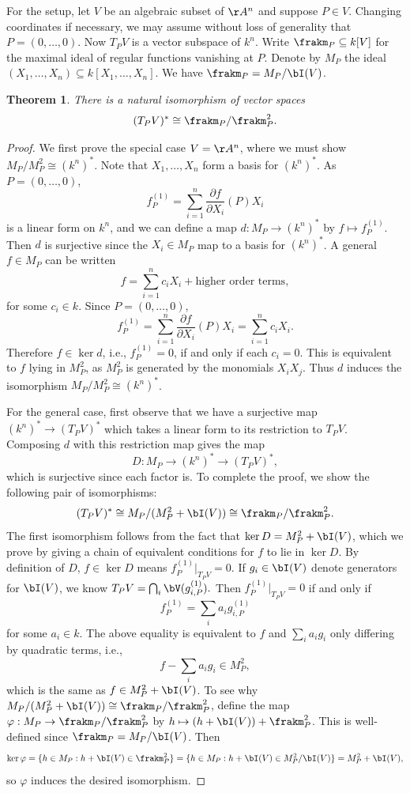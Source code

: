 \documentclass[12pt]{amsart}
\theoremstyle{plain}
\newtheorem{theorem}{Theorem}%
\begin{document}
For the setup, let $V$ be an algebraic subset of $\AA^n$ and suppose $P \in V$.
Changing coordinates if necessary, we may assume without loss of generality that $P=(0, \ldots, 0)$.
Now $T_PV$ is a vector subspace of $k^n$.
Write $\frakm_P\subseteq k[V]$ for the maximal ideal of regular functions vanishing at $P$.
Denote by $M_P$ the ideal $(X_1, \ldots, X_n) \subseteq k[X_1,\ldots, X_n]$.
We have $\frakm_P=M_P/\bI(V)$.

\begin{theorem}
There is a natural isomorphism of vector spaces
$$(T_PV)^* \cong \frakm_P/\frakm_P^2.$$
\end{theorem}
\begin{proof}
We first prove the special case $V=\AA^n$, where we must show $M_P/M_P^2\cong(k^n)^*$.
Note that $X_1, \ldots, X_n$ form a basis for $(k^n)^*$.
As $P=(0, \ldots, 0)$,
$$f_P^{(1)}=\sum_{i=1}^n \frac{\partial f}{\partial X_i}(P) X_i$$
is a linear form on $k^n$, and we can define a map $d : M_P\to(k^n)^*$ by $f \mapsto f_P^{(1)}$.
Then $d$ is surjective since the $X_i \in M_P$ map to a basis for $(k^n)^*$.
A general $f \in M_P$ can be written
$$f=\sum_{i=1}^n c_i X_i + \text{higher order terms},$$
for some $c_i \in k$.
Since $P=(0,\ldots,0)$,
$$f_P^{(1)}=\sum_{i=1}^n\frac{\partial f}{\partial X_i}(P) X_i = \sum_{i=1}^n c_i X_i.$$
Therefore $f \in \ker d$, i.e., $f_P^{(1)} = 0$, if and only if each $c_i=0$.
This is equivalent to $f$ lying in $M_P^2$, as $M_P^2$ is generated by the monomials $X_i X_j$.
Thus $d$ induces the isomorphism $M_P/M_P^2 \cong (k^n)^*$.

For the general case, first observe that we have a surjective map $(k^n)^* \to (T_PV)^*$ which takes a linear form to its restriction to $T_PV$.
Composing $d$ with this restriction map gives the map
$$D:M_P \to (k^n)^* \to (T_PV)^*,$$
which is surjective since each factor is.
To complete the proof, we show the following pair of isomorphisms:
$$(T_PV)^* \cong M_P/(M_P^2+\bI(V)) \cong \frakm_P/\frakm_P^2.$$
The first isomorphism follows from the fact that $\ker D = M_P^2+\bI(V)$, which we prove by giving a chain of equivalent conditions for $f$ to lie in $\ker D$.
By definition of $D$, $f \in \ker D$ means $f_P^{(1)} \big|_{T_PV} = 0$.
If $g_i \in \bI(V)$ denote generators for $\bI(V)$, we know $T_PV = \bigcap_i \bV(g_{i,P}^{(1)}).$
Then $f_P^{(1)} \big|_{T_PV}=0$ if and only if 
$$f_P^{(1)} = \sum_i a_i g_{i,P}^{(1)}$$
for some $a_i \in k$.
The above equality is equivalent to $f$ and $\sum_i a_i g_i$ only differing by quadratic terms, i.e., 
$$f - \sum_i a_i g_i \in M_P^2,$$
which is the same as $f \in M_P^2 + \bI(V)$.
To see why $M_P/(M_P^2+\bI(V)) \cong \frakm_P/\frakm_P^2$, define the map $\varphi : M_P \to \frakm_P/\frakm_P^2$ by $h \mapsto (h+\bI(V)) + \frakm_P^2$.
This is well-defined since $\frakm_P=M_P/\bI(V)$.
Then
$$\ker \varphi = \{h \in M_P : h + \bI(V) \in \frakm_P^2\}=\{h \in M_P:h+\bI(V)\in M_P^2/\bI(V)\}=M_P^2+\bI(V),$$
so $\varphi$ induces the desired isomorphism.
\end{proof}
\newpage
\end{document}
